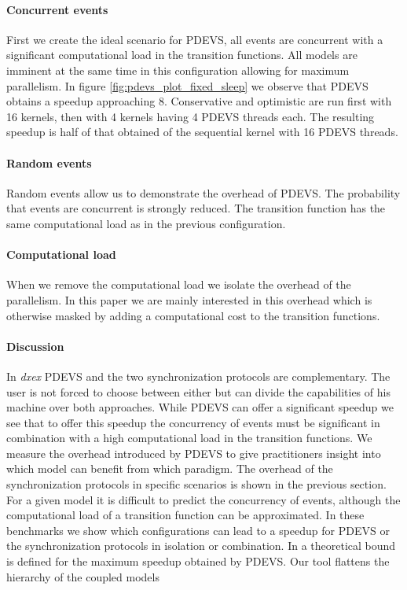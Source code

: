 \paragraph{Concurrent events}
First we create the ideal scenario for PDEVS, all events are concurrent with a significant computational load in the transition functions. All models are imminent at the same time in this configuration allowing for maximum parallelism.
In figure \ref{fig:pdevs_plot_fixed_sleep} we observe that PDEVS obtains a speedup approaching 8. 
Conservative and optimistic are run first with 16 kernels, then with 4 kernels having 4  PDEVS threads each. 
The resulting speedup is half of that obtained of the sequential kernel with 16 PDEVS threads.

\paragraph{Random events}
Random events allow us to demonstrate the overhead of PDEVS. The probability that events are concurrent is strongly reduced.
The transition function has the same computational load as in the previous configuration. 



\paragraph{Computational load}
When we remove the computational load we isolate the overhead of the parallelism. 
In this paper we are mainly interested in this overhead which is otherwise masked by adding a computational cost to the transition functions. 

 
\paragraph{Discussion}
In \textit{dxex} PDEVS and the two synchronization protocols are complementary. The user is not forced to choose between either but can divide the capabilities of his machine over both approaches.
While PDEVS can offer a significant speedup we see that to offer this speedup the concurrency of events must be significant in combination with a high computational load in the transition functions. 
We measure the overhead introduced by PDEVS to give practitioners insight into which model can benefit from which paradigm.
The overhead of the synchronization protocols in specific scenarios  is shown in the previous section.
For a given model it is difficult to predict the concurrency of events, although the computational load of a transition function can be approximated.
In these benchmarks we show which configurations can lead to a speedup for PDEVS or the synchronization protocols in isolation or combination.
In \citep{amdahlpdevs} a theoretical bound is defined for the maximum speedup obtained by PDEVS. 
Our tool flattens the hierarchy of the coupled models


